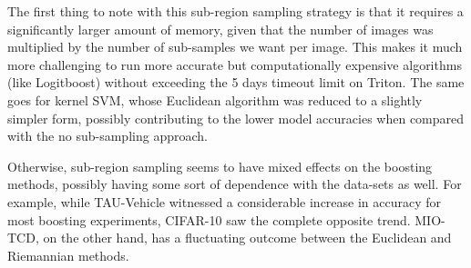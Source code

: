 \documentclass[12pt]{article}
\begin{document}
\begin{sloppypar}
\noindent
The first thing to note with this sub-region sampling strategy is that it requires a significantly larger amount of memory, given that the number of images was multiplied by the number of sub-samples we want per image. This makes it much more challenging to run more accurate but computationally expensive algorithms (like Logitboost) without exceeding the 5 days timeout limit on Triton. The same goes for kernel SVM, whose Euclidean algorithm was reduced to a slightly simpler form, possibly contributing to the lower model accuracies when compared with the no sub-sampling approach.

\noindent
Otherwise, sub-region sampling seems to have mixed effects on the boosting methods, possibly having some sort of dependence with the data-sets as well. For example, while TAU-Vehicle witnessed a considerable increase in accuracy for most boosting experiments, CIFAR-10 saw the complete opposite trend. MIO-TCD, on the other hand, has a fluctuating outcome between the Euclidean and Riemannian methods.

\newpage




\end{sloppypar}
\end{document}
